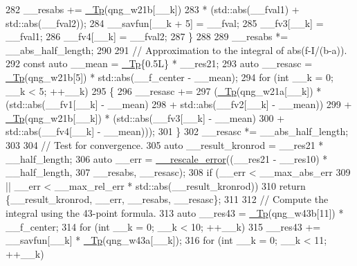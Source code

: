 \begin{DoxyCode}
282           \_\_resabs += \hyperlink{namespace____gnu__cxx_a3b19a9c800ca194374ef9172290f7d79}{\_Tp}(qng\_w21b[\_\_k])
283                     * (std::abs(\_\_fval1) + std::abs(\_\_fval2));
284           \_\_savfun[\_\_k + 5] = \_\_fval;
285           \_\_fv3[\_\_k] = \_\_fval1;
286           \_\_fv4[\_\_k] = \_\_fval2;
287         \}
288 
289       \_\_resabs *= \_\_abs\_half\_length;
290 
291       \textcolor{comment}{// Approximation to the integral of abs(f-I/(b-a)).}
292       \textcolor{keyword}{const} \textcolor{keyword}{auto} \_\_mean = \hyperlink{namespace____gnu__cxx_a3b19a9c800ca194374ef9172290f7d79}{\_Tp}\{0.5L\} * \_\_res21;
293       \textcolor{keyword}{auto} \_\_resasc = \hyperlink{namespace____gnu__cxx_a3b19a9c800ca194374ef9172290f7d79}{\_Tp}(qng\_w21b[5]) * std::abs(\_\_f\_center - \_\_mean);
294       \textcolor{keywordflow}{for} (\textcolor{keywordtype}{int} \_\_k = 0; \_\_k < 5; ++\_\_k)
295         \{
296           \_\_resasc +=
297             (\hyperlink{namespace____gnu__cxx_a3b19a9c800ca194374ef9172290f7d79}{\_Tp}(qng\_w21a[\_\_k]) * (std::abs(\_\_fv1[\_\_k] - \_\_mean)
298                                  + std::abs(\_\_fv2[\_\_k] - \_\_mean))
299            + \hyperlink{namespace____gnu__cxx_a3b19a9c800ca194374ef9172290f7d79}{\_Tp}(qng\_w21b[\_\_k]) * (std::abs(\_\_fv3[\_\_k] - \_\_mean)
300                                  + std::abs(\_\_fv4[\_\_k] - \_\_mean)));
301         \}
302       \_\_resasc *= \_\_abs\_half\_length;
303 
304       \textcolor{comment}{// Test for convergence.}
305       \textcolor{keyword}{auto} \_\_result\_kronrod = \_\_res21 * \_\_half\_length;
306       \textcolor{keyword}{auto} \_\_err = \hyperlink{namespace____gnu__cxx_aeff8a54364ae3976f593b8699626a897}{\_\_rescale\_error}((\_\_res21 - \_\_res10) * \_\_half\_length,
307                                    \_\_resabs, \_\_resasc);
308       \textcolor{keywordflow}{if} (\_\_err < \_\_max\_abs\_err
309        || \_\_err < \_\_max\_rel\_err * std::abs(\_\_result\_kronrod))
310         \textcolor{keywordflow}{return} \{\_\_result\_kronrod, \_\_err, \_\_resabs, \_\_resasc\};
311 
312       \textcolor{comment}{// Compute the integral using the 43-point formula.}
313       \textcolor{keyword}{auto} \_\_res43 = \hyperlink{namespace____gnu__cxx_a3b19a9c800ca194374ef9172290f7d79}{\_Tp}(qng\_w43b[11]) * \_\_f\_center;
314       \textcolor{keywordflow}{for} (\textcolor{keywordtype}{int} \_\_k = 0; \_\_k < 10; ++\_\_k)
315         \_\_res43 += \_\_savfun[\_\_k] * \hyperlink{namespace____gnu__cxx_a3b19a9c800ca194374ef9172290f7d79}{\_Tp}(qng\_w43a[\_\_k]);
316       \textcolor{keywordflow}{for} (\textcolor{keywordtype}{int} \_\_k = 0; \_\_k < 11; ++\_\_k)

\end{DoxyCode}
